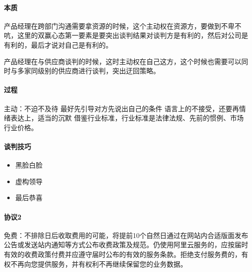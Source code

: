 \documentclass[letterpaper,10pt,english]{sphinxmanual}
\begin{document}
\paragraph{本质}
\label{\detokenize{chapter_idea/negotiation:id2}}
产品经理在跨部门沟通需要拿资源的时候，这个主动权在资源方，要做到不卑不吭，这里的双赢心态第一要素是要突出谈判结果对谈判方是有利的，然后对公司是有利的，最后才说对自己是有利的。

产品经理在与供应商谈判的时候，这时主动权在自己这方，这个时候也需要可以同时与多家同级别的供应商进行谈判，突出迂回策略。


\paragraph{过程}
\label{\detokenize{chapter_idea/negotiation:id3}}
主动：不迫不及待 最好先引导对方先说出自己的条件
语言上的不接受，还要再情绪表达上，适当的沉默
借鉴行业标准，行业标准是法律法规、先前的惯例、市场行业价格。


\paragraph{谈判技巧}
\label{\detokenize{chapter_idea/negotiation:id4}}\begin{itemize}
\item {} 
黑脸白脸

\item {} 
虚构领导

\item {} 
最后恭喜

\end{itemize}


\paragraph{协议2\sphinxfootnotemark[391]}
\label{\detokenize{chapter_idea/negotiation:id5}}%
\begin{footnotetext}[391]\sphinxAtStartFootnote
{}
%
\end{footnotetext}\ignorespaces 
免费：不排除日后收取费用的可能，将提前10个自然日通过在网站内合适版面发布公告或发送站内通知等方式公布收费政策及规范。仍使用阿里云服务的，应按届时有效的收费政策付费并应遵守届时公布的有效的服务条款。拒绝支付服务费的，有权不再向您提供服务，并有权利不再继续保留您的业务数据。
\end{document}
